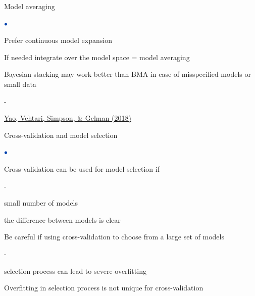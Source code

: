 \documentclass[english,t]{beamer}
\newenvironment{list1}{
   \begin{list}{$\color{list1}\bullet$}{\itemsep=6pt}}{
  \end{list}}
\newenvironment{list2}{
  \begin{list}{-}{\baselineskip=12pt\itemsep=2pt}}{
  \end{list}}
\begin{document}
\begin{frame}{Model averaging}
  
  \begin{list1}
  \item<+-> Prefer continuous model expansion
  \item<+-> If needed integrate over the model space = model averaging
  \item<+-> Bayesian stacking may work better than BMA in case of
    misspecified models or small data
    \begin{list2}
    \item \href{https://projecteuclid.org/euclid.ba/1516093227}{Yao, Vehtari, Simpson, \& Gelman (2018)}
    \end{list2}
  \end{list1}
  
\end{frame}

\begin{frame}{ Cross-validation and model selection}

  \begin{list1}
  \item<1-> Cross-validation can be used for model selection if
    \begin{list2}
      \item small number of models
      \item the difference between models is clear
    \end{list2}
  \item<2-> Be careful if using cross-validation to choose from a large set of models
    \begin{list2}
    \item selection process can lead to severe overfitting
    \end{list2}
  \item<3-> Overfitting in selection process is not unique for cross-validation
  \end{list1}
\end{frame}
\end{document}
